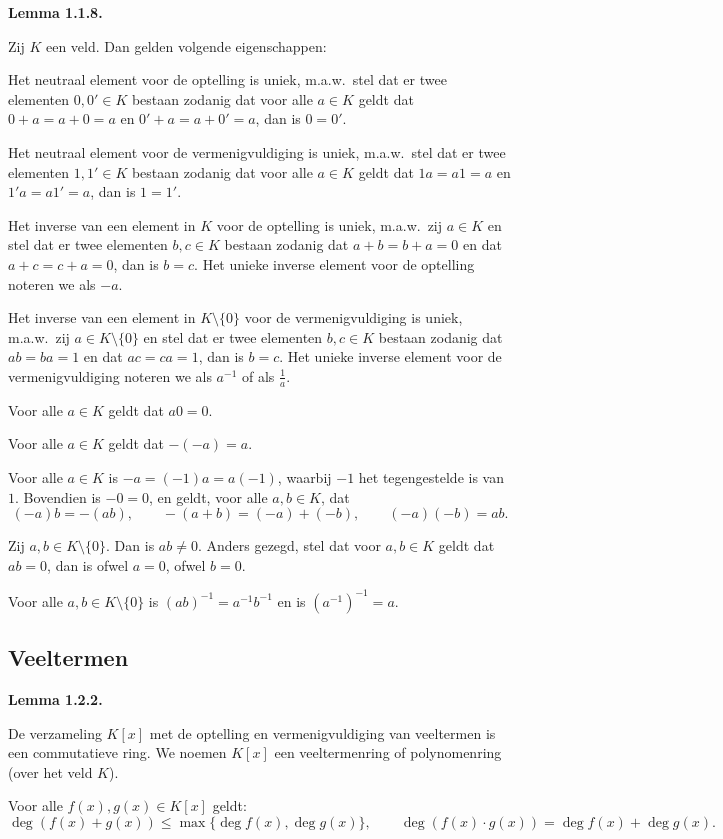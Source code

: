 \documentclass[10pt,a4paper]{article}
\newenvironment{res}[2]{%
  \par\noindent\textbf{#1 #2.}%
}{%
  \par\vspace{2pt}\normalfont
}
\begin{document}
\begin{res}{Lemma}{1.1.8}
Zij $K$ een veld. Dan gelden volgende eigenschappen:
\begin{myenum}
\item Het neutraal element voor de optelling is uniek, m.a.w.\ stel dat er twee elementen $0,0'\in K$ bestaan zodanig dat voor alle $a\in K$ geldt dat $0+a=a+0=a$ en $0'+a=a+0'=a$, dan is $0=0'$.
\item Het neutraal element voor de vermenigvuldiging is uniek, m.a.w.\ stel dat er twee elementen $1,1'\in K$ bestaan zodanig dat voor alle $a\in K$ geldt dat $1a=a1=a$ en $1'a=a1'=a$, dan is $1=1'$.
\item Het inverse van een element in $K$ voor de optelling is uniek, m.a.w.\ zij $a\in K$ en stel dat er twee elementen $b,c\in K$ bestaan zodanig dat $a+b=b+a=0$ en dat $a+c=c+a=0$, dan is $b=c$. Het unieke inverse element voor de optelling noteren we als $-a$.
\item Het inverse van een element in $K\setminus\{0\}$ voor de vermenigvuldiging is uniek, m.a.w.\ zij $a\in K\setminus\{0\}$ en stel dat er twee elementen $b,c\in K$ bestaan zodanig dat $ab=ba=1$ en dat $ac=ca=1$, dan is $b=c$. Het unieke inverse element voor de vermenigvuldiging noteren we als $a^{-1}$ of als $\tfrac1a$.
\item Voor alle $a\in K$ geldt dat $a0=0$.
\item Voor alle $a\in K$ geldt dat $-(-a)=a$.
\item Voor alle $a\in K$ is $-a=(-1)a=a(-1)$, waarbij $-1$ het tegengestelde is van $1$. Bovendien is $-0=0$, en geldt, voor alle $a,b\in K$, dat
\[
(-a)b=-(ab),\qquad -(a+b)=(-a)+(-b),\qquad (-a)(-b)=ab.
\]
\item Zij $a,b\in K\setminus\{0\}$. Dan is $ab\ne0$. Anders gezegd, stel dat voor $a,b\in K$ geldt dat $ab=0$, dan is ofwel $a=0$, ofwel $b=0$.
\item Voor alle $a,b\in K\setminus\{0\}$ is $(ab)^{-1}=a^{-1}b^{-1}$ en is $(a^{-1})^{-1}=a$.
\end{myenum}
\end{res}

\subsection{Veeltermen}
\begin{res}{Lemma}{1.2.2}
\begin{myenum}
\item De verzameling $K[x]$ met de optelling en vermenigvuldiging van veeltermen is een commutatieve ring. We noemen $K[x]$ een veeltermenring of polynomenring (over het veld $K$).
\item Voor alle $f(x),g(x)\in K[x]$ geldt:
\[
\deg(f(x)+g(x))\le\max\{\deg f(x),\deg g(x)\}, \qquad \deg(f(x)\cdot g(x))=\deg f(x)+\deg g(x).
\]
\end{myenum}
\end{res}
\end{document}
